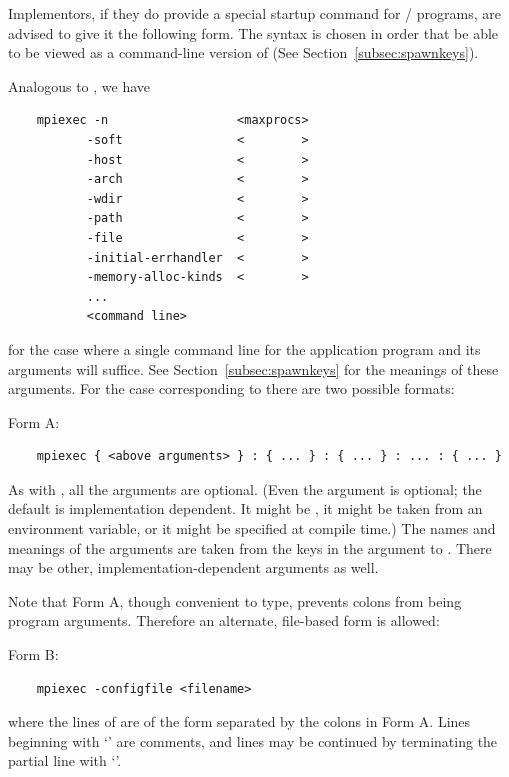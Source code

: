 \begin{implementors}
  Implementors, if they do provide a special startup command for \MPI/ programs,
  are advised to give it the following form.  The syntax is chosen in order
  that  be able to be viewed as a command-line version of
   (See Section~\ref{subsec:spawnkeys}).

  Analogous to , we
  have

\begin{verbatim}
    mpiexec -n                  <maxprocs>
           -soft                <        >
           -host                <        >
           -arch                <        >
           -wdir                <        >
           -path                <        >
           -file                <        >
           -initial-errhandler  <        >
           -memory-alloc-kinds  <        >
           ...
           <command line>
\end{verbatim}
  for the case where a single command line for the application program and its
  arguments will suffice.  See Section~\ref{subsec:spawnkeys} for the meanings
  of these arguments.  For the case corresponding to
   there are two possible formats:

  Form A:

\begin{verbatim}
    mpiexec { <above arguments> } : { ... } : { ... } : ... : { ... }
\end{verbatim}
  As with , all the arguments are optional.  (Even the
   argument is optional; the default is implementation dependent.
  It might be , it might be taken from an environment variable, or it
  might be specified at compile time.)  The names and meanings of the arguments are taken
  from the keys in the  argument to .  There may
  be other, implementation-dependent arguments as well.

  Note that Form A, though convenient to type, prevents colons from being
  program arguments.  Therefore an alternate, file-based form is allowed:

  Form B:

\begin{verbatim}
    mpiexec -configfile <filename>
\end{verbatim}
where the lines of  are of the form separated by the
colons in Form A.  Lines beginning with `\code{\#}' are comments, and lines
may be continued by terminating the partial line with `'.%


\end{implementors}
